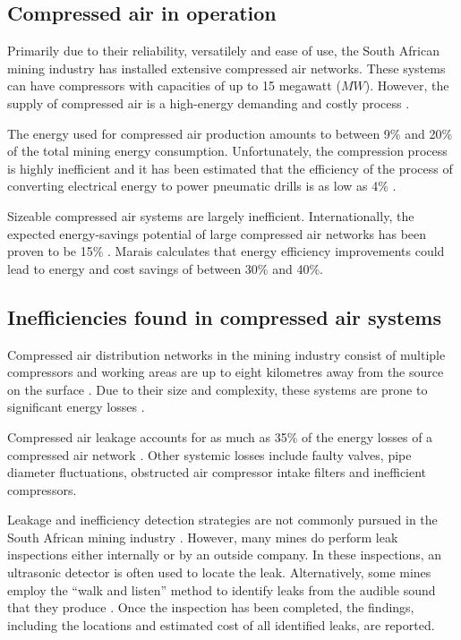 	\subsection{Compressed air in operation}\label{key}
		Primarily due to their reliability, versatilely and ease of use, the South African mining industry has installed extensive compressed air networks. These systems can have compressors with capacities of up to 15 megawatt ($MW$)\cite{Marais2012PhD}. However, the supply of compressed air is a high-energy demanding and costly process \cite{padachi2009energy}.
		\par 
		The energy used for compressed air production amounts to between 9\% and 20\% of the total mining energy consumption\footnotemark[1] \cite{du2011development}.  Unfortunately, the compression process is highly inefficient and it has been estimated that the efficiency of the process of converting electrical energy to power pneumatic drills is as low as 4\% \cite{fraser2008saving}.
		\par
		\clearpage
		Sizeable compressed air systems are largely inefficient. Internationally, the expected energy-savings potential of large compressed air networks has been proven to be 15\% \cite{neale2009compressed}. Marais \cite{marais2013simplification} calculates that energy efficiency improvements could lead to energy and cost savings of between 30\% and 40\%. 
		
	\subsection{Inefficiencies found in compressed air systems}
		Compressed air distribution networks in the mining industry consist of multiple compressors and working areas are up to eight kilometres away from the source on the surface \cite{Marais2012PhD}. Due to their size and complexity, these systems are prone to significant energy losses \cite{Marais2012PhD}.
		\par 
		Compressed air leakage accounts for as much as 35\% of the energy losses of a compressed air network \cite{Lawrence2004Improving}. Other systemic losses include faulty valves, pipe diameter fluctuations, obstructed air compressor intake filters and inefficient compressors. 	
		\par
		Leakage and inefficiency detection strategies are not commonly pursued in the South African mining industry \cite{vanTonder2010Masters}. However, many mines do perform leak inspections either internally or by an outside company. In these inspections, an ultrasonic detector is often used to locate the leak. Alternatively, some mines employ the \enquote{walk and listen} method to identify leaks from the audible sound that they produce \cite{vanTonder2010Masters}. Once the inspection has been completed, the findings, including the locations and estimated cost of all identified leaks, are reported.
		
